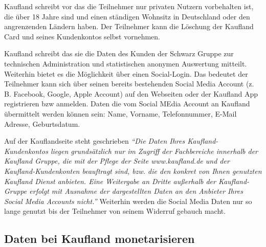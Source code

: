 \noindent Kaufland schreibt vor das die Teilnehmer nur privaten Nutzern vorbehalten ist, die über 18 Jahre sind und einen ständigen Wohnsitz in Deutschland oder den angrenzenden Ländern haben. Der Teilnehmer kann die Löschung der Kaufland Card und seines Kundenkontos selbst vornehmen. \cite{Kaufland_Datenschutz} \newline

\noindent Kaufland schreibt das sie die Daten des Kunden der Schwarz Gruppe zur technischen Administration und statistischen anonymen Auswertung mitteilt. Weiterhin bietet es die Möglichkeit über einen Social-Login. Das bedeutet der Teilnehmer kann sich über seinen bereits bestehenden Social Media Account (z. B. Facebook, Google, Apple Account) auf den Webseiten oder der Kaufland App registrieren bzw anmelden. Daten die vom Social MEdia Account an Kaufland übermittelt werden können sein: Name, Vorname, Telefonnummer, E-Mail Adresse, Geburtsdatum. \newline

\noindent Auf der Kauflandseite steht geschrieben \textit{``Die Daten Ihres Kaufland-Kundenkontos liegen grundsätzlich nur im Zugriff der Fachbereiche innerhalb der Kaufland Gruppe, die mit der Pflege der Seite www.kaufland.de und der Kaufland-Kundenkonten beauftragt sind, bzw. die den konkret von Ihnen genutzten Kaufland Dienst anbieten. Eine Weitergabe an Dritte außerhalb der Kaufland-Gruppe erfolgt mit Ausnahme der dargestellten Daten an den Anbieter Ihres Social Media Accounts nicht.'' \cite{Kaufland_Rechtliches}} Weiterhin werden die Social Media Daten nur so lange genutzt bis der Teilnehmer von seinem Widerruf gebauch macht.

\subsection{Daten bei Kaufland monetarisieren}